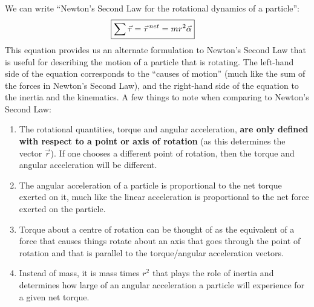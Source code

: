 We can write ``Newton's Second Law for the rotational dynamics of a particle'':
\begin{align}
\Aboxed{\sum \vec \tau = \pvec \tau ^{net} = mr^2 \vec \alpha}
\end{align}
This equation provides us an alternate formulation to Newton's Second Law that is useful for describing the motion of a particle that is rotating. The left-hand side of the equation corresponds to the ``causes of motion'' (much like the sum of the forces in Newton's Second Law), and the right-hand side of the equation to the inertia and the kinematics. A few things to note when comparing to Newton's Second Law:
\begin{enumerate}
\item The rotational quantities, torque and angular acceleration, \textbf{are only defined with respect to a point or axis of rotation} (as this determines the vector $\vec r$). If one chooses a different point of rotation, then the torque and angular acceleration will be different.
\item The angular acceleration of a particle is proportional to the net torque exerted on it, much like the linear acceleration is proportional to the net force exerted on the particle.
\item Torque about a centre of rotation can be thought of as the equivalent of a force that causes things rotate about an axis that goes through the point of rotation and that is parallel to the torque/angular acceleration vectors.
\item Instead of mass, it is mass times $r^2$ that plays the role of inertia and determines how large of an angular acceleration a particle will experience for a given net torque.  
\end{enumerate}

